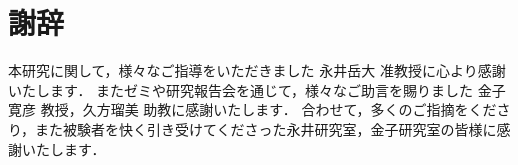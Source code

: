 \chapter*{謝辞}

    本研究に関して，様々なご指導をいただきました 永井岳大 准教授に心より感謝いたします．
    またゼミや研究報告会を通じて，様々なご助言を賜りました 金子寛彦 教授，久方瑠美 助教に感謝いたします．
    合わせて，多くのご指摘をくださり，また被験者を快く引き受けてくださった永井研究室，金子研究室の皆様に感謝いたします．


\clearpage